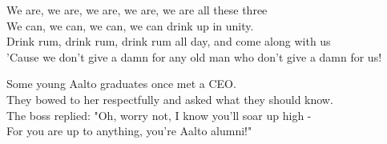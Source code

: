 We are, we are, we are, we are, we are all these three\\
We can, we can, we can, we can drink up in unity.\\
Drink rum, drink rum, drink rum all day, and come along with us\\
'Cause we don't give a damn for any old man who don't give a damn for us!

Some young Aalto graduates once met a CEO.\\
They bowed to her respectfully and asked what they should know.\\
The boss replied: "Oh, worry not, I know you'll soar up high -\\
For you are up to anything, you're Aalto alumni!"